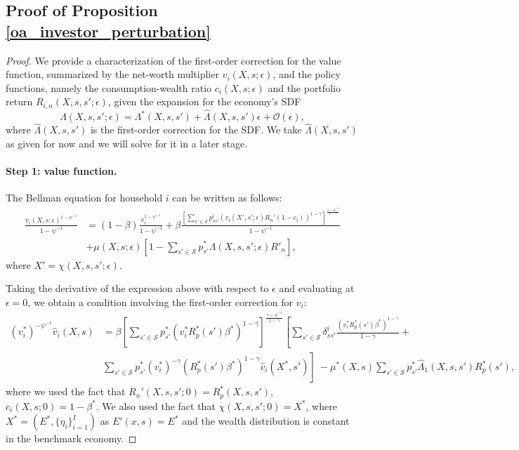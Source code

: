 \subsection{Proof of Proposition \ref{oa_investor_perturbation}}\label{proof: oa_investor_perturbation}
\begin{proof}
We provide a characterization of the first-order correction for the value function, summarized by the net-worth multiplier $v_i(X,s;\epsilon)$, and the policy functions, namely the consumption-wealth ratio $c_i(X,s;\epsilon)$ and the portfolio return $R_{i,n}(X,s,s';\epsilon)$, given the expansion for the economy's SDF
\begin{equation}
    \Lambda(X,s,s';\epsilon) = \Lambda^*(X,s,s') + \hat{\Lambda}(X,s,s') \epsilon + \mathcal{O}(\epsilon),
\end{equation}
where $\hat{\Lambda}(X,s,s')$ is the first-order correction for the SDF. We take $\hat{\Lambda}(X,s,s')$ as given for now and we will solve for it in a later stage. 

\paragraph{Step 1: value function.} The Bellman equation for household $i$ can be written as follows: 
\begin{align}
    \frac{v_i(X,s;\epsilon)^{1-\psi^{-1}}}{1-\psi^{-1}} &= (1-\beta) \frac{c_i^{1-\psi^{-1}}}{1-\psi^{-1}} + \beta \frac{\left[ \sum_{s'\in \mathcal{S}} p_{ss'}^i(v_i(X',s';\epsilon)R_n' (1-c_i))^{1-\gamma}\right]^{\frac{1-\psi^{-1}}{1-\gamma}}}{1-\psi^{-1}}\\\nonumber
    &+\mu(X,s;\epsilon) \left[ 1 - \sum_{s'\in \mathcal{S}} p_{s'}^* \Lambda(X,s,s';\epsilon) R'_n  \right],
\end{align}
where $X' = \chi(X,s,s';\epsilon)$.  

Taking the derivative of the expression above with respect to $\epsilon$ and evaluating at $\epsilon = 0$, we obtain a condition involving the first-order correction for $v_i$:\small
\begin{align}
  (v_i^*)^{-\psi^{-1}} \hat{v}_i(X,s)  &= \beta \left[ \sum_{s'\in \mathcal{S}} p_{s'}^* 
  (v_i^* R_p^*(s') \beta^*)^{1-\gamma}\right]^{\frac{\gamma-\psi^{-1}}{1-\gamma}} \left[ \sum_{s'\in \mathcal{S}} \delta_{ss'}^i \frac{(v_i^* R_p^*(s') \beta^*)^{1-\gamma}}{1-\gamma} +\right. \nonumber\\
  &\left.\sum_{s'\in \mathcal{S}} p_{s'}^* (v_i^*)^{-\gamma} (R_p^*(s') \beta^* )^{1-\gamma}\hat{v}_i(X^*,s') \right]\
    -\mu^*(X,s) \sum_{s'\in \mathcal{S}} p_{s'}^* \hat{\Lambda}_1(X,s,s') R_p^*(s') ,
\end{align}\normalsize
where we used the fact that $R_n'(X,s,s';0) = R_p^*(X,s,s')$, $c_i(X,s;0) = 1-\beta^*$. We also used the fact that $\chi(X,s,s'; 0) = X^*$, where $X^* = (E^*, \{\eta_i\}_{i=1}^I)$ as  $E'(x,s) = E^*$ and the wealth distribution is constant in the benchmark economy. 


\end{proof}
